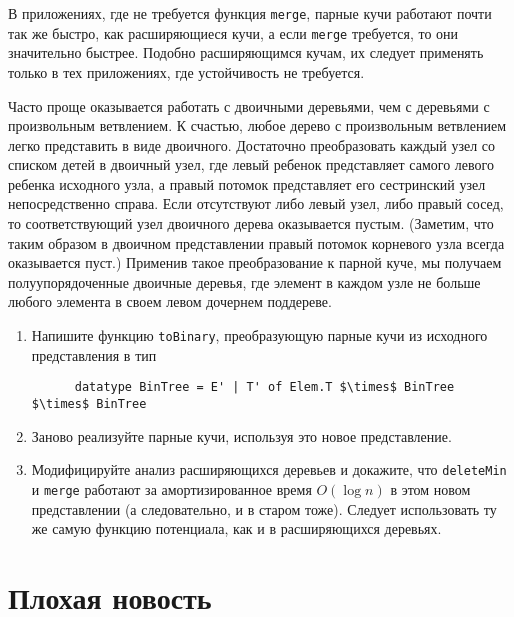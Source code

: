 \begin{hint}
  В приложениях, где не требуется функция \lstinline!merge!, парные
  кучи работают почти так же быстро, как расширяющиеся кучи, а если
  \lstinline!merge! требуется, то они значительно быстрее.  Подобно
  расширяющимся кучам, их следует применять только в тех приложениях,
  где устойчивость не требуется.
\end{hint}

\begin{exercise}\label{ex:5.8}
  Часто проще оказывается работать с двоичными деревьями, чем с деревьями с
  произвольным ветвлением. К счастью, любое дерево с произвольным
  ветвлением легко представить в виде двоичного. Достаточно
  преобразовать каждый узел со списком детей в двоичный узел, где левый ребенок
  представляет самого левого ребенка исходного узла, а правый
  потомок представляет его сестринский узел непосредственно
  справа. Если отсутствуют либо левый узел, либо правый сосед, то
  соответствующий узел двоичного дерева оказывается пустым. (Заметим,
  что таким образом в двоичном представлении правый потомок корневого
  узла всегда оказывается пуст.) Применив такое преобразование к парной
  куче, мы получаем полуупорядоченные двоичные деревья, где элемент в
  каждом узле не больше любого элемента в своем левом дочернем
  поддереве.
  \begin{enumerate}
  \item Напишите функцию \lstinline!toBinary!, преобразующую парные
    кучи из исходного представления в тип
    \begin{lstlisting}
      datatype BinTree = E' | T' of Elem.T $\times$ BinTree $\times$ BinTree
    \end{lstlisting}
  \item Заново реализуйте парные кучи, используя это новое представление.
  \item Модифицируйте анализ расширяющихся деревьев и докажите, что
    \lstinline!deleteMin! и \lstinline!merge! работают за
    амортизированное время $O(\log n)$ в этом новом представлении (а
    следовательно, и в старом тоже). Следует использовать ту же самую
    функцию потенциала, как и в расширяющихся деревьях.
  \end{enumerate}
\end{exercise}

\section{Плохая новость}
\label{sc:5.6}

